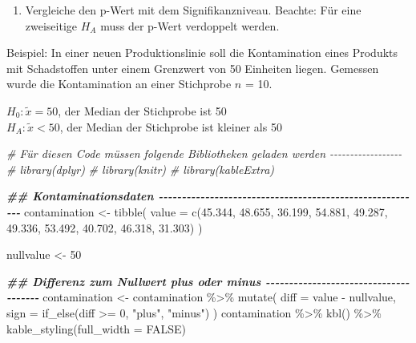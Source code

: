 \documentclass[
]{book}
\newenvironment{Shaded}{\begin{snugshade}}{\end{snugshade}}
\newcommand{\AttributeTok}[1]{\textcolor[rgb]{0.77,0.63,0.00}{#1}}
\newcommand{\CommentTok}[1]{\textcolor[rgb]{0.56,0.35,0.01}{\textit{#1}}}
\newcommand{\ConstantTok}[1]{\textcolor[rgb]{0.00,0.00,0.00}{#1}}
\newcommand{\DecValTok}[1]{\textcolor[rgb]{0.00,0.00,0.81}{#1}}
\newcommand{\DocumentationTok}[1]{\textcolor[rgb]{0.56,0.35,0.01}{\textbf{\textit{#1}}}}
\newcommand{\FloatTok}[1]{\textcolor[rgb]{0.00,0.00,0.81}{#1}}
\newcommand{\FunctionTok}[1]{\textcolor[rgb]{0.00,0.00,0.00}{#1}}
\newcommand{\NormalTok}[1]{#1}
\newcommand{\OtherTok}[1]{\textcolor[rgb]{0.56,0.35,0.01}{#1}}
\newcommand{\SpecialCharTok}[1]{\textcolor[rgb]{0.00,0.00,0.00}{#1}}
\newcommand{\StringTok}[1]{\textcolor[rgb]{0.31,0.60,0.02}{#1}}
\providecommand{\tightlist}{%
  \setlength{\itemsep}{0pt}\setlength{\parskip}{0pt}}
\begin{document}
\begin{enumerate}
\def\labelenumi{\arabic{enumi}.}
\setcounter{enumi}{3}
\tightlist
\item
  Vergleiche den p-Wert mit dem Signifikanzniveau. Beachte: Für eine zweiseitige \(H_A\) muss der p-Wert verdoppelt werden.
\end{enumerate}

Beispiel: In einer neuen Produktionslinie soll die Kontamination eines Produkts mit Schadstoffen
unter einem Grenzwert von 50 Einheiten liegen. Gemessen wurde die Kontamination an einer Stichprobe \(n\) = 10.

\(H_0: \tilde{x} = 50\), der Median der Stichprobe ist 50\\
\(H_A: \tilde{x} < 50\), der Median der Stichprobe ist kleiner als 50

\begin{Shaded}
\begin{Highlighting}[]
\CommentTok{\# Für diesen Code müssen folgende Bibliotheken geladen werden {-}{-}{-}{-}{-}{-}{-}{-}{-}{-}{-}{-}{-}{-}{-}{-}{-}{-}}
\CommentTok{\# library(dplyr)}
\CommentTok{\# library(knitr)}
\CommentTok{\# library(kableExtra)}

\DocumentationTok{\#\# Kontaminationsdaten {-}{-}{-}{-}{-}{-}{-}{-}{-}{-}{-}{-}{-}{-}{-}{-}{-}{-}{-}{-}{-}{-}{-}{-}{-}{-}{-}{-}{-}{-}{-}{-}{-}{-}{-}{-}{-}{-}{-}{-}{-}{-}{-}{-}{-}{-}{-}{-}{-}{-}{-}{-}{-}{-}{-}{-}{-}}
\NormalTok{contamination }\OtherTok{\textless{}{-}} \FunctionTok{tibble}\NormalTok{(}
  \AttributeTok{value =} \FunctionTok{c}\NormalTok{(}\FloatTok{45.344}\NormalTok{, }\FloatTok{48.655}\NormalTok{, }\FloatTok{36.199}\NormalTok{, }\FloatTok{54.881}\NormalTok{, }\FloatTok{49.287}\NormalTok{, }
            \FloatTok{49.336}\NormalTok{, }\FloatTok{53.492}\NormalTok{, }\FloatTok{40.702}\NormalTok{, }\FloatTok{46.318}\NormalTok{, }\FloatTok{31.303}\NormalTok{)}
\NormalTok{)}

\NormalTok{nullvalue }\OtherTok{\textless{}{-}} \DecValTok{50}

\DocumentationTok{\#\# Differenz zum Nullwert plus oder minus {-}{-}{-}{-}{-}{-}{-}{-}{-}{-}{-}{-}{-}{-}{-}{-}{-}{-}{-}{-}{-}{-}{-}{-}{-}{-}{-}{-}{-}{-}{-}{-}{-}{-}{-}{-}{-}{-}}
\NormalTok{contamination }\OtherTok{\textless{}{-}}\NormalTok{ contamination }\SpecialCharTok{\%\textgreater{}\%} 
  \FunctionTok{mutate}\NormalTok{(}
    \AttributeTok{diff =}\NormalTok{ value }\SpecialCharTok{{-}}\NormalTok{ nullvalue,}
    \AttributeTok{sign =} \FunctionTok{if\_else}\NormalTok{(diff }\SpecialCharTok{\textgreater{}=} \DecValTok{0}\NormalTok{, }\StringTok{"plus"}\NormalTok{, }\StringTok{"minus"}\NormalTok{)}
\NormalTok{  )}
\NormalTok{contamination }\SpecialCharTok{\%\textgreater{}\%} 
  \FunctionTok{kbl}\NormalTok{() }\SpecialCharTok{\%\textgreater{}\%} 
  \FunctionTok{kable\_styling}\NormalTok{(}\AttributeTok{full\_width =} \ConstantTok{FALSE}\NormalTok{)}
\end{Highlighting}
\end{Shaded}
\end{document}
